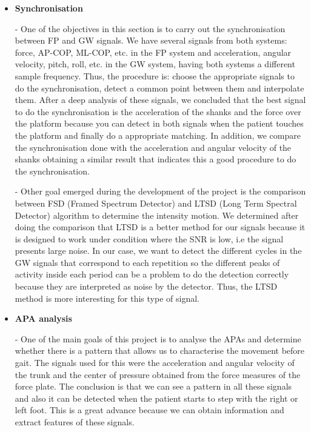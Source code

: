 \begin{itemize}
\item \textbf{Synchronisation}

-	One of the objectives in this section is to carry out the synchronisation between FP and GW signals. We have several signals from both systems: force, AP-COP, ML-COP, etc. in the FP system and acceleration, angular velocity, pitch, roll, etc. in the GW system, having both systems a different sample frequency. Thus, the procedure is: choose the appropriate signals to do the synchronisation, detect a common point between them and interpolate them.
After a deep analysis of these signals, we concluded that the best signal to do the synchronisation is the acceleration of the shanks and the force over the platform because you can detect in both signals when the patient touches the platform and finally do a appropriate matching.
In addition, we compare the synchronisation done with the acceleration and angular velocity of the shanks obtaining a similar result that indicates this a good procedure to do the synchronisation.

-	Other goal emerged during the development of the project is the comparison between FSD (Framed Spectrum Detector) and LTSD (Long Term Spectral Detector) algorithm to determine the intensity motion. We determined after doing the comparison that LTSD is a better method for our signals because it is designed to work under condition where the SNR is low, i.e the signal presents large noise. In our case, we want to detect the different cycles in the GW signals that correspond to each repetition so the different peaks of activity inside each period can be a problem to do the detection correctly because they are interpreted as noise by the detector. Thus, the LTSD method is more interesting for this type of signal.


\item \textbf{APA analysis}

-	One of the main goals of this project is to analyse the APAs and determine whether there is a pattern that allows us to characterise the movement before gait. The signals used for this were the acceleration and angular velocity of the trunk and the center of pressure obtained from the force measures of the force plate. The conclusion is that we can see a pattern in all these signals and also it can be detected when the patient starts to step with the right or left foot. This is a great advance because we can obtain information and extract features of these signals.


\end{itemize}
